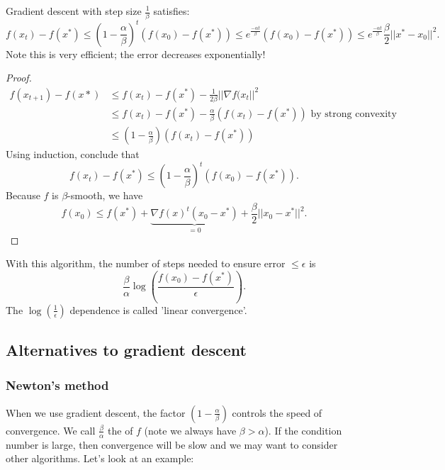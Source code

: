\documentclass[egregdoesnotlikesansseriftitles,a4paper]{scrartcl}
\begin{document}
\begin{theorem}
	Gradient descent with step size $\frac{1}{\beta}$ satisfies: 
	\[f(x_t)-f(x^*)\leq (1-\frac{\alpha}{\beta})^t (f(x_0)-f(x^*))\leq e^{\frac{-\alpha t}{\beta}} (f (x_0)- f (x^*))\leq e^{\frac{-\alpha t}{\beta}} \frac{\beta}{2}||x^*-x_0||^2.\]
	Note this is very efficient; the error decreases exponentially!

\end{theorem}
\begin{proof}
	 \begin{equation*}
		  \begin{split}
			  f(x_{t+1})-f (x*)&\leq f (x_t)- f (x^*)-\frac{1}{2\beta}||\nabla f(x_t||^2\\
			  &\leq f(x_t)- f (x^*) - \frac{\alpha}{\beta}(f (x_t)-f (x^*)) \text{ by strong convexity} \\
			  &\leq (1-\frac{\alpha}{\beta}	)(f (x_t)-f (x^*))
		  \end{split}
	 \end{equation*}
	 Using induction, conclude that 
	 \[f (x_t)-f (x^*)\leq (1-\frac{\alpha}{\beta})^t (f (x_0)-f (x^*)).\]
	 Because $f$ is $\beta$-smooth, we have 
	 \[f(x_0)\leq f (x^*)+\underbrace{\nabla f (x)^t (x_0-x^*)}_{=0}+\frac{\beta}{2}||x_0-x^*||^2.\]
\end{proof}
\begin{remark}
	With this algorithm, the number of steps needed to ensure error $\leq \epsilon$ is 
	\[\frac{\beta}{\alpha}\log (\frac{f (x_0)-f (x^*)}{\epsilon} ).\]
	The $\log (\frac{1}{\epsilon })$ dependence is called 'linear convergence'.
	
\end{remark}
\subsection{Alternatives to gradient descent}
\subsubsection{Newton's method}
When we use gradient descent, the factor $(1-\frac{\alpha}{\beta})$ controls the speed of convergence. We call $\frac{\beta}{\alpha}$ the  of $f$ (note we always have $\beta>\alpha$). If the condition number is large, then convergence will be slow and we may want to consider other algorithms. Let's look at an example:
\end{document}
